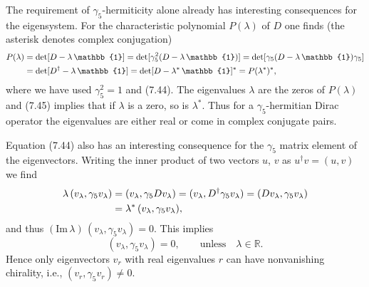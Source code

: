 The requirement of $\gamma_5$-hermiticity alone already has interesting
consequences for the eigensystem. For the characteristic polynomial $P(\lambda)$
of $D$ one finds (the asterisk denotes complex conjugation)
\begin{align}
  P(\lambda) &= \det[D - \lambda\,\mathbb{1}]
  = \det[\gamma_5^2(D-\lambda\,\mathbb{1})]
  = \det[\gamma_5(D-\lambda\,\mathbb{1})\gamma_5] \notag\\
  &= \det[D^\dagger - \lambda\,\mathbb{1}]
  = \det[D - \lambda^*\,\mathbb{1}]^*
  = P(\lambda^*)^*,
\end{align}
where we have used $\gamma_5^2 = 1$ and (7.44). The eigenvalues $\lambda$ are
the zeros of $P(\lambda)$ and (7.45) implies that if $\lambda$ is a zero, so is
$\lambda^*$. Thus for a $\gamma_5$-hermitian Dirac operator the eigenvalues
are either real or come in complex conjugate pairs.

Equation (7.44) also has an interesting consequence for the $\gamma_5$ matrix
element of the eigenvectors. Writing the inner product of two vectors $u$, $v$
as $u^\dagger v = (u, v)$ we find
\begin{align}
  \lambda\,(v_\lambda, \gamma_5 v_\lambda)
  &= (v_\lambda, \gamma_5 D v_\lambda)
  = (v_\lambda, D^\dagger\gamma_5 v_\lambda)
  = (D v_\lambda, \gamma_5 v_\lambda) \notag\\
  &= \lambda^*\,(v_\lambda, \gamma_5 v_\lambda),
\end{align}
and thus $(\mathrm{Im}\,\lambda)\,(v_\lambda, \gamma_5 v_\lambda) = 0$. This
implies
\begin{equation}
  (v_\lambda, \gamma_5 v_\lambda) = 0, \qquad \text{unless} \quad \lambda \in \mathbb{R} .
\end{equation}
Hence only eigenvectors $v_r$ with real eigenvalues $r$ can have nonvanishing
chirality, i.e., $(v_r, \gamma_5 v_r) \neq 0$.

